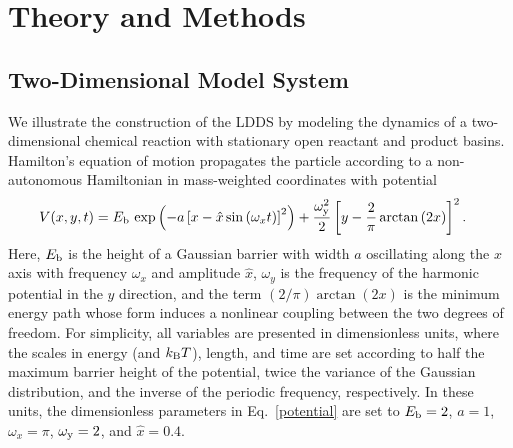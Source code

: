 \documentclass{elsarticle}
\begin{document}
\section{Theory and Methods}
\subsection{Two-Dimensional Model System}
We illustrate the construction of the LDDS by modeling the dynamics of a 
two-dimensional chemical reaction with stationary open
reactant and product basins.
Hamilton's equation of motion propagates the particle according to a 
non-autonomous Hamiltonian in mass-weighted coordinates with potential
% 
\begin{align}
\begin{aligned}
V(x, y, t) =\;& 
E_\mathrm{b}\,\exp\left(
  -a\left[x- \hat{x} \sin\left(\omega_x t \right)\right]^2\right) + 
\frac{\omega_\mathrm{y}^2}{2}\left[y-\frac{2}{\pi}
\arctan\left(2 x \right)\right]^2.
\label{potential}
\end{aligned}
\end{align}
Here, $E_\mathrm{b}$ is the height of a Gaussian barrier with width $a$ oscillating 
along the $x$ 
axis with frequency $\omega_x$ and amplitude $\hat x$, $\omega_y$ is the 
frequency of the harmonic potential in the $y$ direction, and the term 
$({2}/{\pi}) \arctan\left(2 x \right)$ is the minimum energy path whose form 
induces a nonlinear coupling between the two degrees of freedom.
For simplicity, all variables are presented in dimensionless units, where
the scales in energy (and $k_\mathrm{B} T$), length, and time are set according to
half the maximum barrier height of the potential,
twice the variance of the Gaussian distribution,
and the inverse of the periodic frequency, respectively.
In these units, the dimensionless parameters in Eq.~\eqref{potential}
are set to
$E_\mathrm{b}=2$, $a=1$, $\omega_x=\pi$, $\omega_\mathrm{y}=2$, and
$\hat x = 0.4$. 
\end{document}
